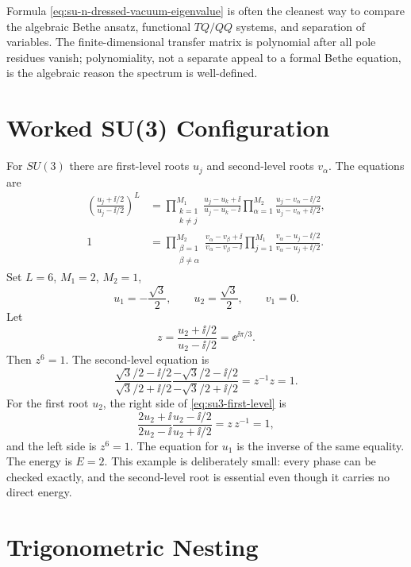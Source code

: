 Formula \eqref{eq:su-n-dressed-vacuum-eigenvalue} is often the cleanest way
to compare the algebraic Bethe ansatz, functional \(TQ/QQ\) systems, and
separation of variables.  The finite-dimensional transfer matrix is
polynomial after all pole residues vanish; polynomiality, not a separate
appeal to a formal Bethe equation, is the algebraic reason the spectrum is
well-defined.

\section{Worked SU(3) Configuration}

For \(SU(3)\) there are first-level roots \(u_j\) and second-level roots
\(v_\alpha\).  The equations are
\begin{align}
  \left(\frac{u_j+\ii/2}{u_j-\ii/2}\right)^L
  &=
  \prod_{\substack{k=1\\ k\neq j}}^{M_1}
  \frac{u_j-u_k+\ii}{u_j-u_k-\ii}
  \prod_{\alpha=1}^{M_2}
  \frac{u_j-v_\alpha-\ii/2}{u_j-v_\alpha+\ii/2},
  \label{eq:su3-first-level}\\
  1
  &=
  \prod_{\substack{\beta=1\\ \beta\neq\alpha}}^{M_2}
  \frac{v_\alpha-v_\beta+\ii}{v_\alpha-v_\beta-\ii}
  \prod_{j=1}^{M_1}
  \frac{v_\alpha-u_j-\ii/2}{v_\alpha-u_j+\ii/2}.
  \label{eq:su3-second-level}
\end{align}
Set \(L=6\), \(M_1=2\), \(M_2=1\),
\[
  u_1=-\frac{\sqrt3}{2},\qquad
  u_2=\frac{\sqrt3}{2},\qquad
  v_1=0 .
\]
Let
\[
  z=\frac{u_2+\ii/2}{u_2-\ii/2}=\ee^{\ii\pi/3}.
\]
Then \(z^6=1\).  The second-level equation is
\[
  \frac{\sqrt3/2-\ii/2}{\sqrt3/2+\ii/2}
  \frac{-\sqrt3/2-\ii/2}{-\sqrt3/2+\ii/2}
  =
  z^{-1}z=1 .
\]
For the first root \(u_2\), the right side of
\eqref{eq:su3-first-level} is
\[
  \frac{2u_2+\ii}{2u_2-\ii}
  \frac{u_2-\ii/2}{u_2+\ii/2}
  =
  z\,z^{-1}=1,
\]
and the left side is \(z^6=1\).  The equation for \(u_1\) is the inverse of
the same equality.  The energy is \(E=2\).  This example is deliberately
small: every phase can be checked exactly, and the second-level root is
essential even though it carries no direct energy.

\section{Trigonometric Nesting}

